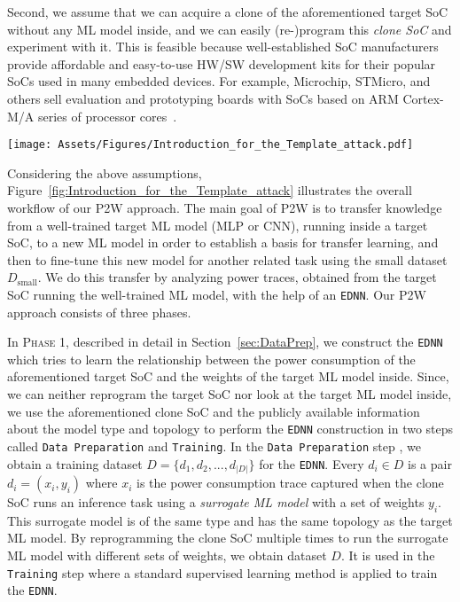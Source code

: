 \documentclass[letterpaper]{article}
\begin{document}
Second, we assume that we can acquire a clone of the aforementioned target SoC without any ML model inside, and we can easily (re-)program this \emph{clone SoC} and experiment with it. This is feasible because well-established SoC manufacturers provide affordable and easy-to-use HW/SW development kits for their popular SoCs used in many embedded devices. For example, Microchip, STMicro, and others sell evaluation and prototyping boards with SoCs based on ARM Cortex-M/A series of processor cores~\cite{noauthor_evaluation_nodate,noauthor_stm32_nodate}.    


\begin{figure*}[!t]
\centerline{\texttt{[image: Assets/Figures/Introduction\_for\_the\_Template\_attack.pdf]}}
    \caption{High-level overview of the phases in the P2W transfer learning approach, including \texttt{EDNN} Model Construction, EDNN-based Power Analysis, and Initializing and Fine-tuning of the new ML model.}
    \label{fig:Introduction_for_the_Template_attack}
\end{figure*}

Considering the above assumptions, Figure~\ref{fig:Introduction_for_the_Template_attack} illustrates the overall workflow of our P2W approach. The main goal of P2W is to transfer knowledge from a well-trained target ML model (MLP or CNN), running inside a target SoC, to a new ML model in order to establish a basis for transfer learning, and then to fine-tune this new model for another related task using the small dataset $D_{\text{small}}$. We do this transfer by analyzing power traces, obtained from the target SoC running the well-trained ML model, with the help of an \texttt{EDNN}. Our P2W approach consists of three phases.


In \textsc{Phase 1}, described in detail in Section~\ref{sec:DataPrep}, we construct the \texttt{EDNN} which tries to learn the relationship between the power consumption of the aforementioned target SoC and the weights of the target ML model inside. Since, we can neither reprogram the target SoC nor look at the target ML model inside, we use the aforementioned clone SoC and the publicly available information about the model type and topology to perform the \texttt{EDNN} construction in two steps called \texttt{Data Preparation} and \texttt{Training}. In the \texttt{Data Preparation} step , we obtain a training dataset $D = \{d_1, d_2, ..., d_{|D|}\}$ for the \texttt{EDNN}. Every $d_i \in D$ is a pair $ d_i= (x_i,y_i)$ where $x_i$ is the power consumption trace captured when the clone SoC runs an inference task using a \emph{surrogate ML model} with a set of weights $y_i$. This surrogate model is of the same type and has the same topology as the target ML model. By reprogramming the clone SoC multiple times to run the surrogate ML model with different sets of weights, we obtain dataset $D$. It is used in the \texttt{Training} step where a standard supervised learning method is applied to train the \texttt{EDNN}.
\end{document}
